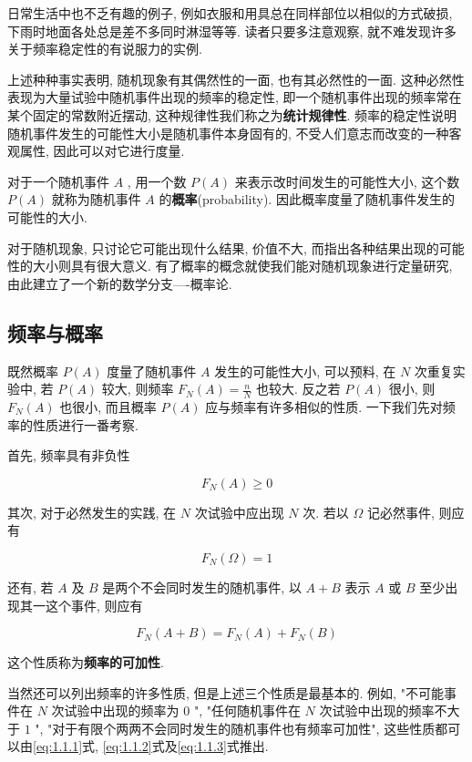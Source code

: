 \documentclass[../../main.tex]{subfiles}
\begin{document}
日常生活中也不乏有趣的例子, 例如衣服和用具总在同样部位以相似的方式破损, 下雨时地面各处总是差不多同时淋湿等等. 读者只要多注意观察, 就不难发现许多关于频率稳定性的有说服力的实例. 

上述种种事实表明, 随机现象有其偶然性的一面, 也有其必然性的一面. 这种必然性表现为大量试验中随机事件出现的频率的稳定性, 即一个随机事件出现的频率常在某个固定的常数附近摆动, 这种规律性我们称之为\textbf{统计规律性}. 频率的稳定性说明随机事件发生的可能性大小是随机事件本身固有的, 不受人们意志而改变的一种客观属性, 因此可以对它进行度量. 

对于一个随机事件 $A$ , 用一个数 $P(A)$ 来表示改时间发生的可能性大小, 这个数 $P(A)$ 就称为随机事件 $A$ 的\textbf{概率}(probability). 因此概率度量了随机事件发生的可能性的大小. 

对于随机现象, 只讨论它可能出现什么结果, 价值不大, 而指出各种结果出现的可能性的大小则具有很大意义. 有了概率的概念就使我们能对随机现象进行定量研究, 由此建立了一个新的数学分支----概率论. 

\subsection{频率与概率}

既然概率 $P(A)$ 度量了随机事件 $A$ 发生的可能性大小, 可以预料, 在 $N$ 次重复实验中, 若 $P(A)$ 较大, 则频率 $F_N(A)=\frac{n}{N}$ 也较大. 反之若 $P(A)$ 很小, 则 $F_N(A)$ 也很小, 而且概率 $P(A)$ 应与频率有许多相似的性质. 一下我们先对频率的性质进行一番考察. 

首先, 频率具有非负性

\begin{equation}
    F_N(A)\geq0
    \label{eq:1.1.1}
\end{equation}

其次, 对于必然发生的实践, 在 $N$ 次试验中应出现 $N$ 次. 若以 $\Omega$ 记必然事件, 则应有

\begin{equation}
    F_N(\Omega)=1
    \label{eq:1.1.2}
\end{equation}

还有, 若 $A$ 及 $B$ 是两个不会同时发生的随机事件, 以 $A+B$ 表示 $A$ 或 $B$ 至少出现其一这个事件, 则应有

\begin{equation}
    F_N(A+B)=F_N(A)+F_N(B)
    \label{eq:1.1.3}
\end{equation}

这个性质称为\textbf{频率的可加性}. 

当然还可以列出频率的许多性质, 但是上述三个性质是最基本的. 例如, "不可能事件在 $N$ 次试验中出现的频率为 $0$ ", "任何随机事件在 $N$ 次试验中出现的频率不大于 $1$ ", "对于有限个两两不会同时发生的随机事件也有频率可加性", 这些性质都可以由\eqref{eq:1.1.1}式, \eqref{eq:1.1.2}式及\eqref{eq:1.1.3}式推出. 
\end{document}
